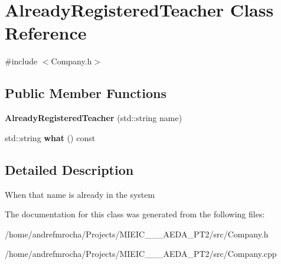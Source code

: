\hypertarget{class_already_registered_teacher}{}\section{Already\+Registered\+Teacher Class Reference}
\label{class_already_registered_teacher}


{\ttfamily \#include $<$Company.\+h$>$}

\subsection*{Public Member Functions}
\begin{DoxyCompactItemize}
\item 
\mbox{\label{class_already_registered_teacher_ab6bdaf12fd3147274d10f6595d424a8e}} 
{\bfseries Already\+Registered\+Teacher} (std\+::string name)
\item 
\mbox{\label{class_already_registered_teacher_a3d7912fc2aa048ad661db2fa82f17d35}} 
std\+::string {\bfseries what} () const
\end{DoxyCompactItemize}


\subsection{Detailed Description}
When that name is already in the system 

The documentation for this class was generated from the following files\+:\begin{DoxyCompactItemize}
\item 
/home/andrefmrocha/\+Projects/\+M\+I\+E\+I\+C\+\_\+\_\+\_\+\+A\+E\+D\+A\+\_\+\+P\+T2/src/Company.\+h\item 
/home/andrefmrocha/\+Projects/\+M\+I\+E\+I\+C\+\_\+\_\+\_\+\+A\+E\+D\+A\+\_\+\+P\+T2/src/Company.\+cpp\end{DoxyCompactItemize}

